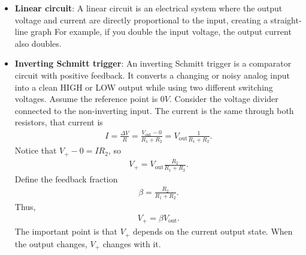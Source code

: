 \documentclass{report}
\begin{document}
\begin{itemize}
            Because $V_{OL}$ is negative, $V_{UT}$ becomes positive.
            \bigbreak \noindent 
            Similarly, while the input is falling, the output is initially high, so
            \begin{align*}
                V_{LT} = V_{\text{ref}} + \frac{R_{\text{in}}}{R_{f}}(V_{\text{ref}} - V_{OH})
            .\end{align*}
            If $V_{\text{ref}} = 0$, 
            \begin{align*}
                V_{LT} = -\frac{R_{\text{in}}}{R_{f}}V_{OH}
            .\end{align*}
        \item \textbf{Linear circuit}: A linear circuit is an electrical system where the output voltage and current are directly proportional to the input, creating a straight-line graph
            \bigbreak \noindent 
            For example, if you double the input voltage, the output current also doubles.
        \item \textbf{Inverting Schmitt trigger}: An inverting Schmitt trigger is a comparator circuit with positive feedback. It converts a changing or noisy analog input into a clean HIGH or LOW output while using two different switching voltages.
            \bigbreak \noindent 
            \bigbreak \noindent 
            Assume the reference point is $0V$. Consider the voltage divider connected to the non-inverting input. The current is the same through both resistors, that current is
            \begin{align*}
                I = \frac{\Delta V}{R} = \frac{V_{\text{out}} - 0}{R_{1} + R_{2}} = V_{\text{out}}\frac{1}{R_{1}+R_{2}}
            .\end{align*}
            Notice that $V_{+} - 0 = IR_{2}$, so
            \begin{align*}
                V_{+} = V_{\text{out}}\frac{R_{2}}{R_{1} + R_{2}}
            .\end{align*}
            Define the feedback fraction
            \begin{align*}
                \beta = \frac{R_{2}}{R_{1} + R_{2}}
            .\end{align*}
            Thus,
            \begin{align*}
                V_{+} = \beta V_{\text{out}}
            .\end{align*}
            The important point is that \(V_+\) depends on the current output state. When the output changes, \(V_+\) changes with it.

\end{itemize}
\end{document}
